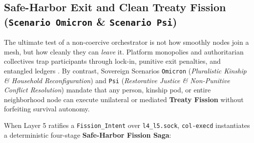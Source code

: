 \subsection{Safe-Harbor Exit and Clean Treaty Fission (\texttt{Scenario Omicron} \& \texttt{Scenario Psi})}

The ultimate test of a non-coercive orchestrator is not how smoothly nodes join a mesh, but how
cleanly they can \emph{leave} it. Platform monopolies and authoritarian collectives trap
participants through lock-in, punitive exit penalties, and entangled ledgers
\parencite{hirschman1970,scott1998}. By contrast, Sovereign Scenarios \texttt{Omicron}
(\textit{Pluralistic Kinship \& Household Reconfiguration}) and \texttt{Psi}
(\textit{Restorative Justice \& Non-Punitive Conflict Resolution}) \parencite{zehr1990} mandate
that any person, kinship pod, or entire neighborhood node can execute unilateral or mediated
\textbf{Treaty Fission} without forfeiting survival autonomy.

When Layer 5 ratifies a \texttt{Fission\_Intent} over \texttt{l4\_l5.sock}, \texttt{col-execd}
instantiates a deterministic four-stage \textbf{Safe-Harbor Fission Saga}:

